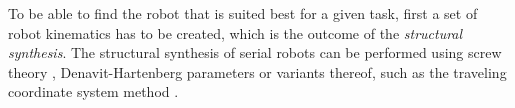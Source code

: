 \documentclass[runningheads]{llncs}
\begin{document}
To be able to find the robot that is suited best for a given task, first a set of robot kinematics has to be created, which is the outcome of the \emph{structural synthesis}.
The structural synthesis of serial robots can be performed using screw theory \cite{KuoDai2010}, Denavit-Hartenberg parameters \cite{Ramirez2018} or variants thereof, such as the traveling coordinate system method \cite{Gogu2002}.
\end{document}
